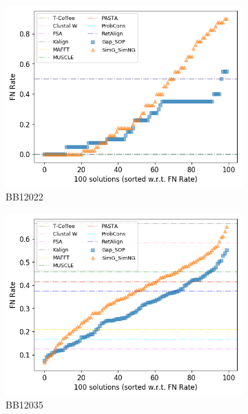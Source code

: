 \begin{figure}[!htbp]
\begin{adjustwidth}{-1cm}{-1cm}
\begin{subfigure}{0.22\textwidth}
		\end{subfigure}
		\begin{subfigure}{0.22\textwidth}
			\includegraphics[width=\columnwidth]{Figure/summary/precomputedInit/Balibase/BB12022_fnrate_density_single_run}
			\caption{BB12022}
		\end{subfigure}
		\begin{subfigure}{0.22\textwidth}
			\includegraphics[width=\columnwidth]{Figure/summary/precomputedInit/Balibase/BB12035_fnrate_density_single_run}
			\caption{BB12035}
		\end{subfigure}
		\begin{subfigure}{0.22\textwidth}

\end{subfigure}
\end{adjustwidth}
\end{figure}
